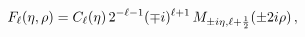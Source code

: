\[\mathop{F_{\ell}\/}\nolimits\!\left(\eta,\rho\right)=\mathop{C_{\ell}\/}%
\nolimits\!\left(\eta\right)2^{-\ell-1}(\mp i)^{\ell+1}\mathop{M_{\pm i\eta,%
\ell+\frac{1}{2}}\/}\nolimits\!\left(\pm 2i\rho\right),\]